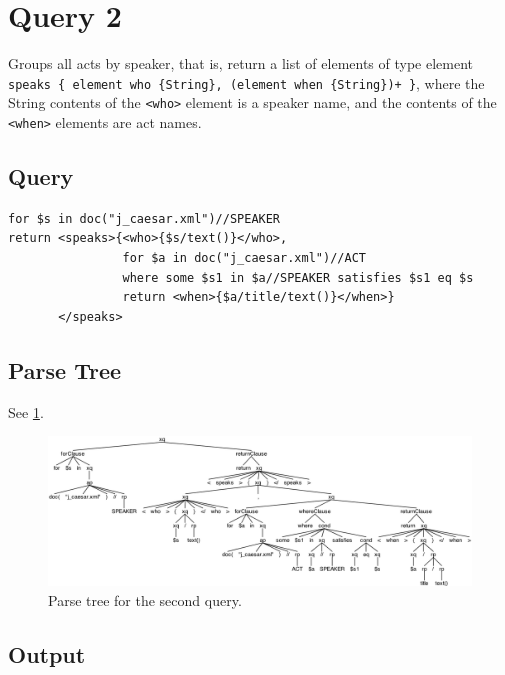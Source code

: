 \documentclass{article}
\begin{document}
\section{Query 2}
Groups all acts by speaker, that is, return a list of elements of type element  \texttt{speaks \{ element who \{String\}, (element when \{String\})+ \}}, where the String contents of the \texttt{<who>} element is a speaker name, and the contents of the \texttt{<when>} elements are act names.

\subsection{Query}
\begin{verbatim}
for $s in doc("j_caesar.xml")//SPEAKER
return <speaks>{<who>{$s/text()}</who>,
                for $a in doc("j_caesar.xml")//ACT
                where some $s1 in $a//SPEAKER satisfies $s1 eq $s
                return <when>{$a/title/text()}</when>}
       </speaks>
\end{verbatim}

\subsection{Parse Tree}
See \cref{fig:parseTree2}.
\begin{figure}[htpb]
  \centering
  \includegraphics[width=\linewidth]{imgs/antlr4_parse_tree_query_2.png}
  \caption{Parse tree for the second query.}\label{fig:parseTree2}
\end{figure}

\subsection{Output}
\end{document}
